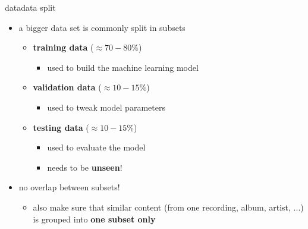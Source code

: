        \begin{frame}{data}{data split}
            \begin{itemize}
                \item   a bigger data set is commonly split in subsets
                    \smallskip
                    \begin{itemize}
                        \item   \textbf{training data} ($\approx 70-80\%$)
                            \begin{itemize}
                                \item   used to build the machine learning model
                            \end{itemize}
                        \smallskip
                        \item   \textbf{validation data }($\approx 10-15\%$)
                            \begin{itemize}
                                \item   used to tweak model parameters
                            \end{itemize}
                        \smallskip
                        \item   \textbf{testing data} ($\approx 10-15\%$)
                            \begin{itemize}
                                \item   used to evaluate the model
                                \item   needs to be \textbf{unseen}!
                            \end{itemize}
                    \end{itemize}
                \bigskip
                \item   no overlap between subsets!
                    \begin{itemize}
                        \item also make sure that similar content (from one recording, album, artist, ...) is grouped into \textbf{one subset only}
                    \end{itemize}
            \end{itemize}
        \end{frame}
        
